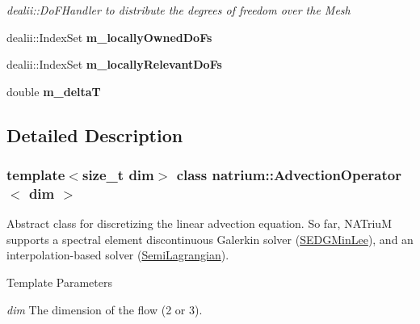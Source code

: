 \begin{DoxyCompactItemize}
\begin{DoxyCompactList}\small\item\em dealii::DoFHandler to distribute the degrees of freedom over the Mesh \item\end{DoxyCompactList}\item 
\hypertarget{classnatrium_1_1AdvectionOperator_a06f200c873b739bbd1a2f6b4fcf34d40}{
dealii::IndexSet {\bfseries m\_\-locallyOwnedDoFs}}
\label{classnatrium_1_1AdvectionOperator_a06f200c873b739bbd1a2f6b4fcf34d40}

\item 
\hypertarget{classnatrium_1_1AdvectionOperator_a8c23c164bd3db14ce88a54801354615e}{
dealii::IndexSet {\bfseries m\_\-locallyRelevantDoFs}}
\label{classnatrium_1_1AdvectionOperator_a8c23c164bd3db14ce88a54801354615e}

\item 
\hypertarget{classnatrium_1_1AdvectionOperator_ae8a58e4761fb827914d48d39d98265d8}{
double {\bfseries m\_\-deltaT}}
\label{classnatrium_1_1AdvectionOperator_ae8a58e4761fb827914d48d39d98265d8}

\end{DoxyCompactItemize}


\subsection{Detailed Description}
\subsubsection*{template$<$size\_\-t dim$>$ class natrium::AdvectionOperator$<$ dim $>$}

Abstract class for discretizing the linear advection equation. So far, NATriuM supports a spectral element discontinuous Galerkin solver (\hyperlink{classnatrium_1_1SEDGMinLee}{SEDGMinLee}), and an interpolation-\/based solver (\hyperlink{classnatrium_1_1SemiLagrangian}{SemiLagrangian}). 
\begin{DoxyTemplParams}{Template Parameters}
\item[{\em dim}]The dimension of the flow (2 or 3). \end{DoxyTemplParams}


